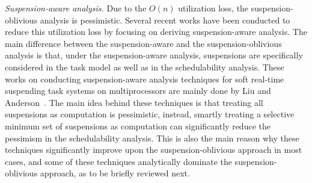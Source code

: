 \textit{Suspension-aware analysis.} Due to the $O(n)$ utilization loss, the suspension-oblivious analysis is pessimistic. Several recent works have been conducted to reduce this utilization loss by focusing on deriving suspension-aware analysis. The main difference between the suspension-aware and the suspension-oblivious analysis is that, under the suspension-aware analysis, suspensions are specifically considered in the task model as well as in the schedulability analysis. These works on conducting suspension-aware analysis techniques for soft real-time suspending task systems on multiprocessors are mainly done by Liu and Anderson~\cite{Liu3, Liu4, Liu5, Liu9, Liu11}. The main idea behind these techniques is that treating all suspensions as computation is pessimistic, instead, smartly treating a selective minimum set of suspensions as computation can significantly reduce the pessimism in the schedulability analysis. This is also the main reason why these techniques significantly improve upon the suspension-oblivious approach in most cases, and some of these techniques analytically dominate the suspension-oblivious approach, as to be briefly reviewed next.

